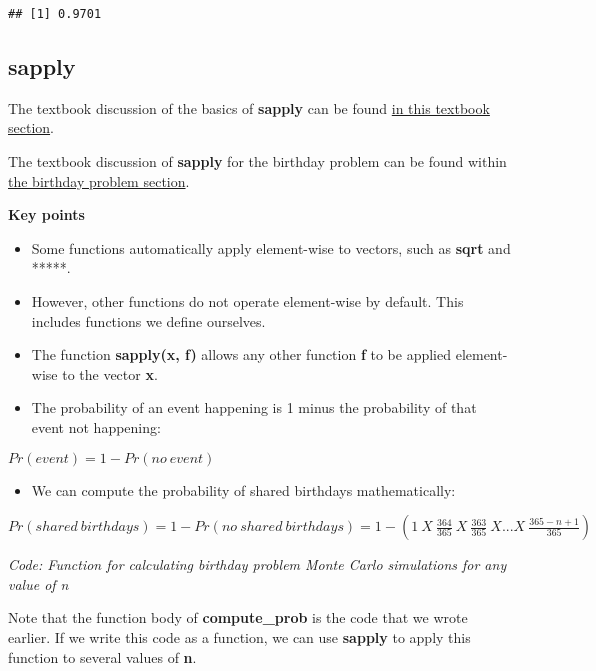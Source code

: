 \documentclass[
]{article}
\providecommand{\tightlist}{%
  \setlength{\itemsep}{0pt}\setlength{\parskip}{0pt}}
\begin{document}
\begin{verbatim}
## [1] 0.9701
\end{verbatim}

\hypertarget{sapply}{%
\subsection{sapply}\label{sapply}}

The textbook discussion of the basics of \textbf{sapply} can be found
\href{https://rafalab.github.io/dsbook/programming-basics.html\#vectorization}{in
this textbook section}.

The textbook discussion of \textbf{sapply} for the birthday problem can
be found within
\href{https://rafalab.github.io/dsbook/probability.html\#birthday-problem}{the
birthday problem section}.

\textbf{Key points}

\begin{itemize}
\tightlist
\item
  Some functions automatically apply element-wise to vectors, such as
  \textbf{sqrt} and *****.
\item
  However, other functions do not operate element-wise by default. This
  includes functions we define ourselves.
\item
  The function \textbf{sapply(x, f)} allows any other function
  \textbf{f} to be applied element-wise to the vector \textbf{x}.
\item
  The probability of an event happening is 1 minus the probability of
  that event not happening:
\end{itemize}

\(Pr(event) = 1 - Pr(no\:event)\)

\begin{itemize}
\tightlist
\item
  We can compute the probability of shared birthdays mathematically:
\end{itemize}

\(Pr(shared\:birthdays) = 1 − Pr(no\:shared\:birthdays) = 1 − (1\:X\: \frac{364}{365}\:X \:\frac{363}{365}\:X...X\: \frac{365−n+1}{365})\)

\emph{Code: Function for calculating birthday problem Monte Carlo
simulations for any value of n}

Note that the function body of \textbf{compute\_prob} is the code that
we wrote earlier. If we write this code as a function, we can use
\textbf{sapply} to apply this function to several values of \textbf{n}.
\end{document}
